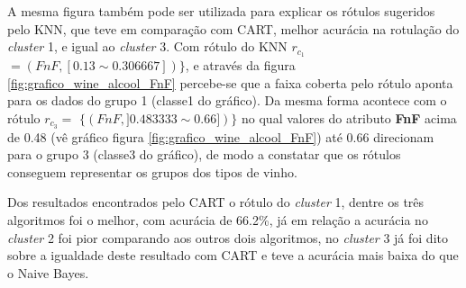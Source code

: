 A mesma figura também pode ser utilizada para explicar os rótulos sugeridos pelo KNN, que teve em comparação com CART, melhor acurácia na rotulação do \textit{cluster} 1, e igual ao \textit{cluster} 3. Com rótulo do KNN ${r_{c_1}}$ ${=(FnF, [ 0.13 \sim  0.306667  ] ) \} }$, e através da figura \ref{fig:grafico_wine_alcool_FnF} percebe-se que a faixa coberta pelo rótulo aponta para os dados do grupo 1 (classe1 do gráfico). Da mesma forma acontece com o rótulo ${r_{c_3}=}$ ${\{ (FnF, ] 0.483333 \sim  0.66 ])\} }$ no qual valores do atributo \textbf{FnF} acima de 0.48 (vê gráfico figura \ref{fig:grafico_wine_alcool_FnF}) até 0.66 direcionam para o grupo 3 (classe3 do gráfico), de modo a constatar que os rótulos conseguem representar os grupos dos tipos de vinho.

Dos resultados encontrados pelo CART o rótulo do \textit{cluster} 1, dentre os três algoritmos foi o melhor, com acurácia de 66.2\%, já em relação a acurácia no \textit{cluster} 2 foi pior comparando aos outros dois algoritmos, no \textit{cluster} 3 já foi dito sobre a igualdade deste resultado com CART e teve a acurácia mais baixa do que o Naive Bayes.


